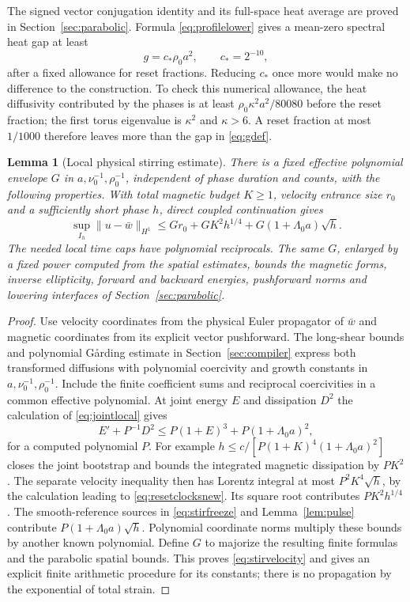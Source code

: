 \documentclass[11pt,a4paper]{amsart}
\newtheorem{lemma}[theorem]{Lemma}
\theoremstyle{definition}
\theoremstyle{remark}
\numberwithin{equation}{section}
\newcommand{\norm}[1]{\lVert #1\rVert}
\begin{document}
The signed vector conjugation identity and its full-space heat average are proved in Section~\ref{sec:parabolic}. Formula \eqref{eq:profilelower} gives a mean-zero spectral heat gap at least
\begin{equation}\label{eq:gdef}
 g=c_*\rho_0a^2,\qquad c_*=2^{-10},
\end{equation}
after a fixed allowance for reset fractions. Reducing $c_*$ once more would make no difference to the construction. To check this numerical allowance, the heat diffusivity contributed by the phases is at least $\rho_0\kappa^2a^2/80080$ before the reset fraction; the first torus eigenvalue is $\kappa^2$ and $\kappa>6$. A reset fraction at most $1/1000$ therefore leaves more than the gap in \eqref{eq:gdef}.

\begin{lemma}[Local physical stirring estimate]\label{lem:stirlocal}
There is a fixed effective polynomial envelope $G$ in $a,\nu_0^{-1},\rho_0^{-1}$, independent of phase duration and counts, with the following properties. With total magnetic budget $K\ge1$, velocity entrance size $r_0$ and a sufficiently short phase $h$, direct coupled continuation gives
\begin{equation}\label{eq:stirvelocity}
 \sup_{I_h}\norm{u-\bar w}_{H^1}
 \le G r_0+G K^2h^{1/4}+G(1+\Lambda_0a)\sqrt h.
\end{equation}
The needed local time caps have polynomial reciprocals. The same $G$, enlarged by a fixed power computed from the spatial estimates, bounds the magnetic forms, inverse ellipticity, forward and backward energies, pushforward norms and lowering interfaces of Section~\ref{sec:parabolic}.
\end{lemma}

\begin{proof}
Use velocity coordinates from the physical Euler propagator of $\bar w$ and magnetic coordinates from its explicit vector pushforward. The long-shear bounds and polynomial G\aa rding estimate in Section~\ref{sec:compiler} express both transformed diffusions with polynomial coercivity and growth constants in $a,\nu_0^{-1},\rho_0^{-1}$. Include the finite coefficient sums and reciprocal coercivities in a common effective polynomial. At joint energy $E$ and dissipation $D^2$ the calculation of \eqref{eq:jointlocal} gives
\[
 E'+P^{-1}D^2\le P(1+E)^3+P(1+\Lambda_0a)^2,
\]
for a computed polynomial $P$. For example
$h\le c/[P(1+K)^4(1+\Lambda_0a)^2]$ closes the joint bootstrap and bounds the integrated magnetic dissipation by $PK^2$. The separate velocity inequality then has Lorentz integral at most $P^2K^4\sqrt h$, by the calculation leading to \eqref{eq:resetclocksnew}. Its square root contributes $PK^2h^{1/4}$. The smooth-reference sources in \eqref{eq:stirfreeze} and Lemma~\ref{lem:pulse} contribute $P(1+\Lambda_0a)\sqrt h$. Polynomial coordinate norms multiply these bounds by another known polynomial. Define $G$ to majorize the resulting finite formulas and the parabolic spatial bounds. This proves \eqref{eq:stirvelocity} and gives an explicit finite arithmetic procedure for its constants; there is no propagation by the exponential of total strain.
\end{proof}
\end{document}
